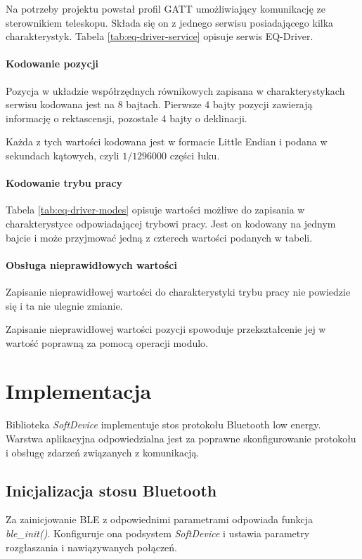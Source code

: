 Na potrzeby projektu powstał profil GATT umożliwiający komunikację ze
sterownikiem teleskopu. Składa się on z jednego serwisu posiadającego kilka
charakterystyk. Tabela \ref{tab:eq-driver-service} opisuje serwis EQ-Driver.

\paragraph{Kodowanie pozycji} Pozycja w układzie współrzędnych równikowych
zapisana w charakterystykach serwisu kodowana jest na 8 bajtach. Pierwsze
4 bajty pozycji zawierają informację o rektascensji, pozostałe 4 bajty
o deklinacji.

Każda z tych wartości kodowana jest w formacie Little Endian i podana
w sekundach kątowych, czyli $1/1296000$ części łuku.

\paragraph{Kodowanie trybu pracy} Tabela \ref{tab:eq-driver-modes} opisuje
wartości możliwe do zapisania w charakterystyce odpowiadającej trybowi pracy.
Jest on kodowany na jednym bajcie i może przyjmować jedną z czterech wartości
podanych w tabeli.

\paragraph{Obsługa nieprawidłowych wartości} Zapisanie nieprawidłowej wartości
do charakterystyki trybu pracy nie powiedzie się i ta nie ulegnie zmianie.

Zapisanie nieprawidłowej wartości pozycji spowoduje przekształcenie jej
w wartość poprawną za pomocą operacji modulo.

\section{Implementacja}

Biblioteka \emph{SoftDevice} implementuje stos protokołu Bluetooth low energy.
Warstwa aplikacyjna odpowiedzialna jest za poprawne skonfigurowanie protokołu
i obsługę zdarzeń związanych z komunikacją.

\subsection{Inicjalizacja stosu Bluetooth}

Za zainicjowanie BLE z odpowiednimi parametrami odpowiada funkcja
\emph{ble\_init()}. Konfiguruje ona podsystem \emph{SoftDevice} i ustawia
parametry rozgłaszania i nawiązywanych połączeń.

